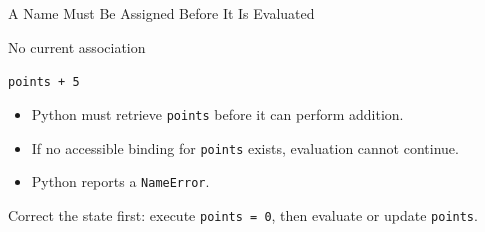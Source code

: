 \documentclass[aspectratio=169,10pt]{beamer}
\begin{document}
\begin{frame}{A Name Must Be Assigned Before It Is Evaluated}

  \begin{block}{No current association}

    \texttt{points + 5}

  \end{block}

  \begin{itemize}

    \item Python must retrieve \texttt{points} before it can perform addition.

    \item If no accessible binding for \texttt{points} exists, evaluation cannot continue.

    \item Python reports a \texttt{NameError}.

  \end{itemize}

  \begin{exampleblockcp}

    Correct the state first: execute \texttt{points = 0}, then evaluate or update \texttt{points}.

  \end{exampleblockcp}


\end{frame}
\end{document}

